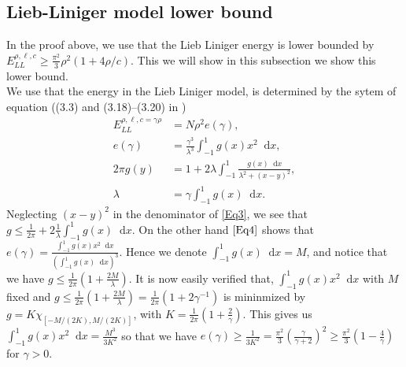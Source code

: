 \documentclass[a4paper,11pt]{article}
\newcommand*\diff{\mathop{}\!\mathrm{d}}
\numberwithin{equation}{section}
\begin{document}
	\subsection{Lieb-Liniger model lower bound}
	In the proof above, we use that the Lieb Liniger energy is lower bounded by $ E_{LL}^{\rho,\ell,c}\geq \frac{\pi^2}{3}\rho^2(1+4\rho/c) $. This we will show in this subsection we show this lower bound.\\
	We use that the energy in the Lieb Liniger model, is determined by the sytem of equation ((3.3) and (3.18)--(3.20) in \cite{PhysRev.130.1605})
	\begin{align}
		E^{\rho,\ell,c=\gamma\rho}_{LL}&=N\rho^2 e(\gamma),\label{Eq1}\\
		e(\gamma)&=\frac{\gamma^3}{\lambda^3}\int_{-1}^{1}g(x)x^2\diff x,\label{Eq2}\\
		2\pi g(y)&=1+2\lambda\int_{-1}^{1}\frac{g(x)\diff x}{\lambda^2+(x-y)^2},\label{Eq3}\\
		\lambda&=\gamma\int_{-1}^{1}g(x)\diff x.\label{Eq4}
	\end{align}
	Neglecting $ (x-y)^2 $ in the denominator of \eqref{Eq3}, we see that $ g\leq \frac{1}{2\pi}+2\frac{1}{\lambda}\int_{-1}^{1}g(x)\diff x $. On the other hand $ \eqref{Eq4} $ shows that $ e(\gamma)=\frac{\int_{-1}^{1}g(x)x^2\diff x}{\left(\int_{-1}^{1}g(x)\diff x\right)^3} $. Hence we denote $ \int_{-1}^{1}g(x)\diff x=M $, and notice that we have $ g\leq \frac{1}{2\pi}\left(1+\frac{2M}{\lambda}\right) $. It is now easily verified that, $ \int_{-1}^{1}g(x)x^2\diff x $ with $ M $ fixed and $ g\leq \frac{1}{2\pi}\left(1+\frac{2M}{\lambda}\right)=\frac{1}{2\pi}\left(1+2\gamma^{-1}\right) $ is mininmized by $ g=K\chi_{[-M/(2K),M/(2K)]} $, with $ K=\frac{1}{2\pi}\left(1+\frac{2}{\gamma}\right) $. This gives us $ \int_{-1}^{1}g(x)x^2\diff x=\frac{M^3}{3K^2}$ so that we have $ e(\gamma)\geq \frac{1}{3K^2}=\frac{\pi^2}{3}\left(\frac{\gamma}{\gamma+2}\right)^2\geq \frac{\pi^2}{3}(1-\frac{4}{\gamma})$ for $ \gamma>0 $.
	
\end{document}
